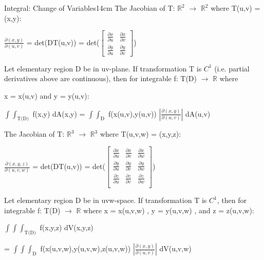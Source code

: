     \newpage



    \begin{wtheorem}{Integral: Change of Variables}{14cm}
        The {\color{lblue} Jacobian} of T: $\mathbb{R}^2$
        $\rightarrow$ $\mathbb{R}^2$ where T(u,v) = (x,y):

        \hspace{0.5cm}
        $\frac{\partial(x,y)}{\partial(u,v)}$
        = det(DT(u,v))
        = det($
        \begin{bmatrix}
            \frac{\partial x}{\partial u} & \frac{\partial x}{\partial v} \\
            \frac{\partial y}{\partial u} & \frac{\partial y}{\partial v}
        \end{bmatrix}
        $)

        Let elementary region D be in uv-plane. If transformation T is
        $C^1$ (i.e. partial derivatives above are continuous),
        then for integrable f: T(D) $\rightarrow$ $\mathbb{R}$
        where
        
        x = x(u,v) and y = y(u,v):

        \hspace{0.5cm}
        $\int \int_\text{T(D)}$ f(x,y) dA(x,y)
        = $\int \int_\text{D}$ f(x(u,v),y(u,v))
            $|\frac{\partial(x,y)}{\partial(u,v)}|$ dA(u,v)

        \vspace{0.5cm}

        The {\color{lblue} Jacobian} of T: $\mathbb{R}^3$
        $\rightarrow$ $\mathbb{R}^3$ where T(u,v,w) = (x,y,z):

        \hspace{0.5cm}
        $\frac{\partial(x,y,z)}{\partial(u,v,w)}$
        = det(DT(u,v))
        = det($
        \begin{bmatrix}
            \frac{\partial x}{\partial u}
            & \frac{\partial x}{\partial v}
            & \frac{\partial x}{\partial w} \\

            \frac{\partial y}{\partial u}
            & \frac{\partial y}{\partial v}
            & \frac{\partial y}{\partial w} \\

            \frac{\partial z}{\partial u}
            & \frac{\partial z}{\partial v}
            & \frac{\partial z}{\partial w} \\
        \end{bmatrix}
        $)

        Let elementary region D be in uvw-space. If transformation T is
        $C^1$, then for integrable f: T(D) $\rightarrow$ $\mathbb{R}$ where
        x = x(u,v,w) , y = y(u,v,w) , and z = z(u,v,w):

        \hspace{0.5cm}
        $\int \int \int_\text{T(D)}$ f(x,y,z) dV(x,y,z)

        \hspace{0.5cm}
        = $\int \int \int_\text{D}$ f(x(u,v,w),y(u,v,w),z(u,v,w))
            $|\frac{\partial(x,y)}{\partial(u,v)}|$ dV(u,v,w)
    \end{wtheorem}

